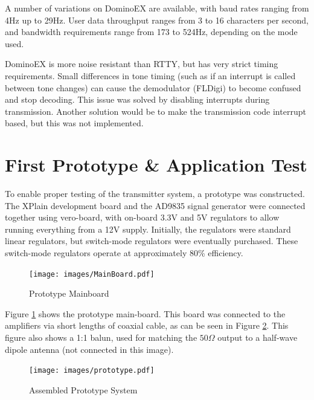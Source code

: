 \documentclass[a4paper,12pt]{article}
\begin{document}
A number of variations on DominoEX are available, with baud rates ranging from 4Hz up to 29Hz. User data throughput ranges from 3 to 16 characters per second, and bandwidth requirements range from 173 to 524Hz, depending on the mode used. 

DominoEX is more noise resistant than RTTY, but has very strict timing requirements. Small differences in tone timing (such as if an interrupt is called between tone changes) can cause the demodulator (FLDigi) to become confused and stop decoding. This issue was solved by disabling interrupts during transmission. Another solution would be to make the transmission code interrupt based, but this was not implemented.



\section{First Prototype \& Application Test}
To enable proper testing of the transmitter system, a prototype was constructed. The XPlain development board and the AD9835 signal generator were connected together using vero-board, with on-board 3.3V and 5V regulators to allow running everything from a 12V supply. Initially, the regulators were standard linear regulators, but switch-mode regulators were eventually purchased. These switch-mode regulators operate at approximately 80\% efficiency.

\begin{figure}[h]
  \begin{center}
    \texttt{[image: images/MainBoard.pdf]}
  \end{center}
  \caption{Prototype Mainboard}
  \label{fig:mainboard}
\end{figure}

Figure \ref{fig:mainboard} shows the prototype main-board. This board was connected to the amplifiers via short lengths of coaxial cable, as can be seen in Figure \ref{fig:prototype}. This figure also shows a 1:1 balun, used for matching the $50\Omega$ output to a half-wave dipole antenna (not connected in this image).

\begin{figure}[h]
  \begin{center}
    \texttt{[image: images/prototype.pdf]}
  \end{center}
  \caption{Assembled Prototype System}
  \label{fig:prototype}
\end{figure}
\end{document}
